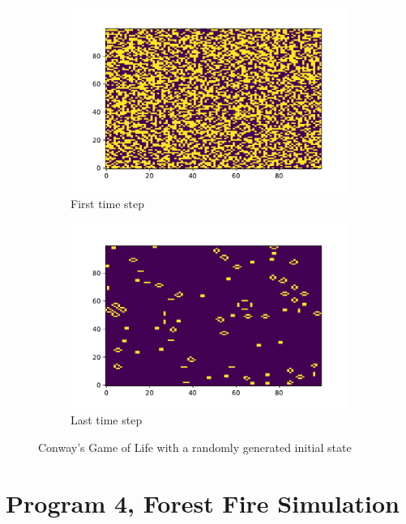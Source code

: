 \documentclass{article}
\begin{document}
\begin{figure}[H]
\centering
\begin{subfigure}{.5\textwidth}
    \centering
    \includegraphics[scale=0.4]{Conway_Random_first.pdf}
    \caption{First time step}\label{fig:ran_first}
\end{subfigure}
\begin{subfigure}{.5\textwidth}
    \centering
    \includegraphics[scale=0.4]{Conway_Random_last.pdf}
    \caption{Last time step}\label{fig:ran_last}
\end{subfigure}
\caption{Conway's Game of Life with a randomly generated initial state}\label{fig:ran}
\end{figure}

\section{Program 4, Forest Fire Simulation}
\end{document}
